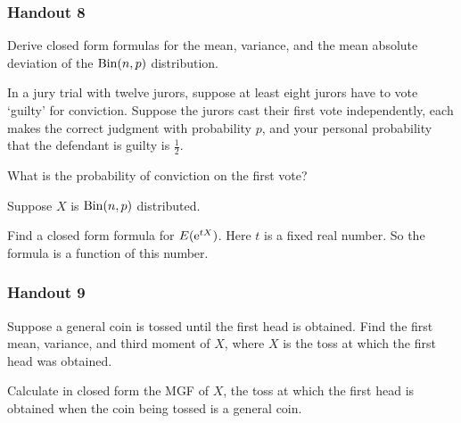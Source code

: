 \subsubsection{Handout 8}
\begin{problem}[Handout 8, \# 4]
  Derive closed form formulas for the mean, variance, and the mean absolute
  deviation of the \(\operatorname{Bin}(n,p)\) distribution.
\end{problem}
\begin{solution*}
\end{solution*}

\begin{problem}[Handout 8, \# 6]
  In a jury trial with twelve jurors, suppose at least eight jurors have to
  vote `guilty' for conviction. Suppose the jurors cast their first vote
  independently, each makes the correct judgment with probability \(p\),
  and your personal probability that the defendant is guilty is
  \(\frac{1}{2}\).

  \noindent What is the probability of conviction on the first vote?
\end{problem}
\begin{solution*}
\end{solution*}

\begin{problem}[Handout 8, \# 11]
  Suppose \(X\) is \(\operatorname{Bin}(n,p)\) distributed.

  \noindent Find a closed form formula for \(E(\mathrm{e}^{tX})\). Here \(t\) is
  a fixed real number. So the formula is a function of this number.
\end{problem}
\begin{solution*}
\end{solution*}

\subsubsection{Handout 9}
\begin{problem}[Handout 9, \# 6]
  Suppose a general coin is tossed until the first head is obtained. Find
  the first mean, variance, and third moment of \(X\), where \(X\) is the
  toss at which the first head was obtained.
\end{problem}
\begin{solution*}
\end{solution*}

\begin{problem}[Handout 9, \# 8]
  Calculate in closed form the MGF of \(X\), the toss at which the first
  head is obtained when the coin being tossed is a general coin.
\end{problem}
\begin{solution*}
\end{solution*}

